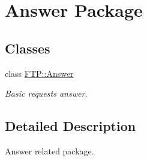 \hypertarget{group__answer}{}\section{Answer Package}
\label{group__answer}
\subsection*{Classes}
\begin{DoxyCompactItemize}
\item 
class \hyperlink{classFTP_1_1Answer}{F\+T\+P\+::\+Answer}
\begin{DoxyCompactList}\small\item\em Basic request\textquotesingle{}s answer. \end{DoxyCompactList}\end{DoxyCompactItemize}


\subsection{Detailed Description}
Answer related package. 